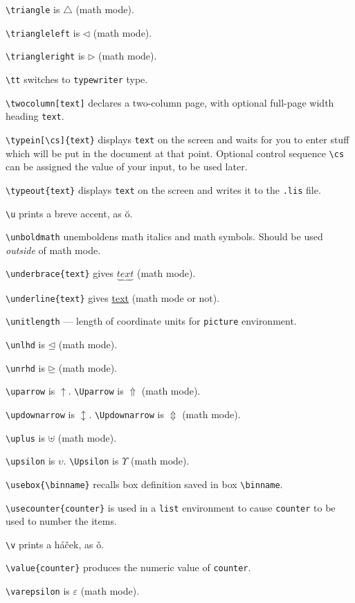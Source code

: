 \verb"\triangle" is $\triangle$ (math mode).

\verb"\triangleleft" is $\triangleleft$ (math mode).

\verb"\triangleright" is $\triangleright$ (math mode).

\verb"\tt" switches to {\tt typewriter} type.

\verb"\twocolumn[text]" declares a two-column page, with optional full-page
	width heading \verb"text".

\verb"\typein[\cs]{text}" displays \verb"text" on the screen and waits for
	you to enter stuff which will be put in the document at that point.
	Optional control sequence \verb"\cs" can be assigned the value
	of your input, to be used later.

\verb"\typeout{text}" displays \verb"text" on the screen and writes it to
	the \verb".lis" file.

\verb"\u" prints a breve accent, as \u o.

\verb"\unboldmath" unemboldens math italics and math symbols.  Should
	be used {\em outside} of math mode.

\verb"\underbrace{text}" gives $\underbrace{text}$ (math mode).

\verb"\underline{text}" gives \underline{text} (math mode or not).

\verb"\unitlength" --- length of coordinate units for \verb"picture"
	environment.

\verb"\unlhd" is $\unlhd$ (math mode).

\verb"\unrhd" is $\unrhd$ (math mode).

\verb"\uparrow" is $\uparrow$. \verb"\Uparrow" is $\Uparrow$ (math mode).

\verb"\updownarrow" is $\updownarrow$. \verb"\Updownarrow" is $\Updownarrow$
	(math mode).

\verb"\uplus" is $\uplus$ (math mode).

\verb"\upsilon" is $\upsilon$. \verb"\Upsilon" is $\Upsilon$ (math mode).

\verb"\usebox{\binname}" recalls box definition saved in box
	\verb"\binname".

\verb"\usecounter{counter}" is used in a \verb"list" environment to cause
	\verb"counter" to be used to number the items.

\verb"\v" prints a h\'a\v cek, as \v o.

\verb"\value{counter}" produces the numeric value of \verb"counter".

\verb"\varepsilon" is $\varepsilon$ (math mode).


